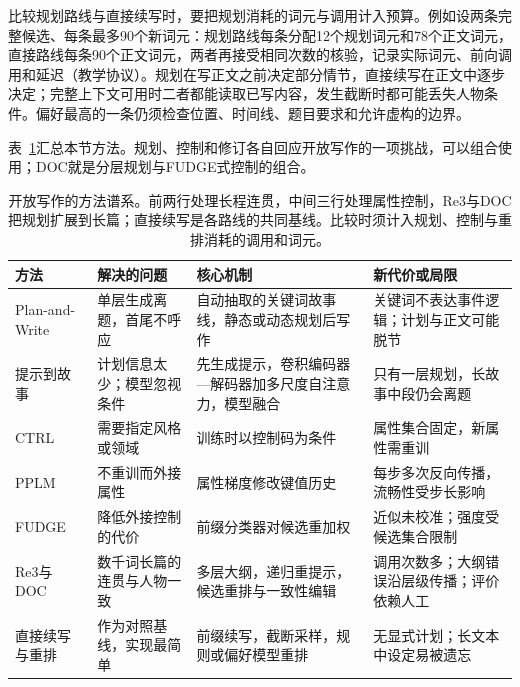 比较规划路线与直接续写时，要把规划消耗的词元与调用计入预算。例如设两条完整候选、每条最多90个新词元：规划路线每条分配12个规划词元和78个正文词元，直接路线每条90个正文词元，两者再接受相同次数的核验，记录实际词元、前向调用和延迟（教学协议）。规划在写正文之前决定部分情节，直接续写在正文中逐步决定；完整上下文可用时二者都能读取已写内容，发生截断时都可能丢失人物条件。偏好最高的一条仍须检查位置、时间线、题目要求和允许虚构的边界。

表~\ref{tab:nlp-generation-writing-methods}汇总本节方法。规划、控制和修订各自回应开放写作的一项挑战，可以组合使用；DOC就是分层规划与FUDGE式控制的组合。

\begin{table}[htbp]
  \centering
  \small
  \begin{tabularx}{\linewidth}{@{}>{\raggedright\arraybackslash}p{24mm}
    >{\raggedright\arraybackslash}X>{\raggedright\arraybackslash}X
    >{\raggedright\arraybackslash}X@{}}
    \toprule
    方法 & 解决的问题 & 核心机制 & 新代价或局限 \\
    \midrule
    Plan-and-Write & 单层生成离题，首尾不呼应 & 自动抽取的关键词故事线，静态或动态规划后写作 & 关键词不表达事件逻辑；计划与正文可能脱节 \\
    提示到故事 & 计划信息太少；模型忽视条件 & 先生成提示，卷积编码器—解码器加多尺度自注意力，模型融合 & 只有一层规划，长故事中段仍会离题 \\
    CTRL & 需要指定风格或领域 & 训练时以控制码为条件 & 属性集合固定，新属性需重训 \\
    PPLM & 不重训而外接属性 & 属性梯度修改键值历史 & 每步多次反向传播，流畅性受步长影响 \\
    FUDGE & 降低外接控制的代价 & 前缀分类器对候选重加权 & 近似未校准；强度受候选集合限制 \\
    Re3与DOC & 数千词长篇的连贯与人物一致 & 多层大纲，递归重提示，候选重排与一致性编辑 & 调用次数多；大纲错误沿层级传播；评价依赖人工 \\
    直接续写与重排 & 作为对照基线，实现最简单 & 前缀续写，截断采样，规则或偏好模型重排 & 无显式计划；长文本中设定易被遗忘 \\
    \bottomrule
  \end{tabularx}
  \caption{开放写作的方法谱系。前两行处理长程连贯，中间三行处理属性控制，Re3与DOC把规划扩展到长篇；直接续写是各路线的共同基线。比较时须计入规划、控制与重排消耗的调用和词元。}
  \label{tab:nlp-generation-writing-methods}
\end{table}
